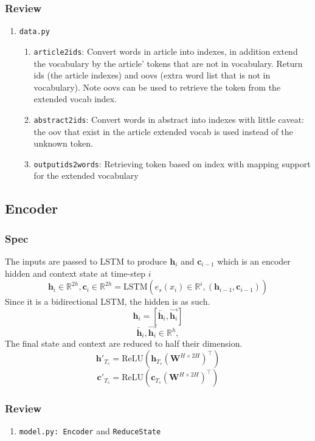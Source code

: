 \documentclass{article}
\begin{document}
  \subsubsection{Review}
  \begin{enumerate}
    \item \texttt{data.py}
    \begin{enumerate}
      \item \texttt{article2ids}: Convert words in article into indexes, in addition extend the vocabulary by the article' tokens that are not in vocabulary. Return ids (the article indexes) and oovs (extra word list that is not in vocabulary). Note oovs can be used to retrieve the token from the extended vocab index.
      \item \texttt{abstract2ids}: Convert words in abstract into indexes with little caveat: the oov that exist in the article extended vocab is used instead of the unknown token.
      \item \texttt{outputids2words}: Retrieving token based on index with mapping support for the extended vocabulary
    \end{enumerate}
  \end{enumerate}
  \subsection{Encoder}
  \subsubsection{Spec}
  The inputs are passed to LSTM to produce $\mathbf{h}_i$ and $\mathbf{c}_{i-1}$ which is an encoder hidden and context state at time-step $i$
  \[
    \mathbf{h}_i \in \mathbb{R}^{2h}, \mathbf{c}_i \in \mathbb{R}^{2h} = \text{LSTM}(e_s(x_i) \in \mathbb{R}^i, (\mathbf{h}_{i-1}, \mathbf{c}_{i-1}))
  \]
  Since it is a bidirectional LSTM, the hidden is as such.
  \[
    \mathbf{h}_i = [\overleftarrow{\mathbf{h}_i}, \overrightarrow{\mathbf{h}_i}]
  \]
  \[
    \overleftarrow{\mathbf{h}_i}, \overrightarrow{\mathbf{h}_i} \in \mathbb{R}^h,
  \]
  The final state and context are reduced to half their dimension.
  \[
    \mathbf{h}'_{T_s} = \text{ReLU}(\mathbf{h}_{T_s} (\mathbf{W}^{H\times 2H})^\intercal)
  \]
  \[
    \mathbf{c}'_{T_s} = \text{ReLU}(\mathbf{c}_{T_s} (\mathbf{W}^{H\times 2H})^\intercal)
  \]
  \subsubsection{Review}
  \begin{enumerate}
    \item \texttt{model.py: Encoder} and \texttt{ReduceState}
  \end{enumerate}
\end{document}
